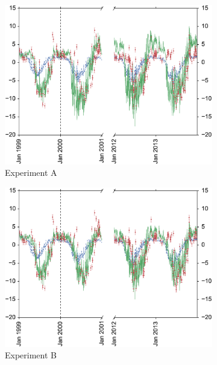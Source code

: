 \documentclass[11pt]{article}
\begin{document}
\begin{figure}
    \centering
    \begin{subfigure}[b]{0.49\textwidth}
        \includegraphics[width=\textwidth]{Abroke4dvar.eps}
        \caption{Experiment A}
        \label{fig:broke4dvardiagBR}
    \end{subfigure}
    \begin{subfigure}[b]{0.49\textwidth}
        \includegraphics[width=\textwidth]{Bbroke4dvar.eps}
        \caption{Experiment B}
        \label{fig:broke4dvaredcBR}
    \end{subfigure}
    \begin{subfigure}[b]{0.49\textwidth}

\end{subfigure}
\end{figure}
\end{document}
